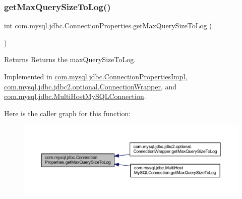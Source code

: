 \subsubsection{\texorpdfstring{get\+Max\+Query\+Size\+To\+Log()}{getMaxQuerySizeToLog()}}
{\footnotesize\ttfamily int com.\+mysql.\+jdbc.\+Connection\+Properties.\+get\+Max\+Query\+Size\+To\+Log (\begin{DoxyParamCaption}{ }\end{DoxyParamCaption})}

\begin{DoxyReturn}{Returns}
Returns the max\+Query\+Size\+To\+Log. 
\end{DoxyReturn}


Implemented in \mbox{\hyperlink{classcom_1_1mysql_1_1jdbc_1_1_connection_properties_impl_af533f73f3b344a7b3b50e647bb90563d}{com.\+mysql.\+jdbc.\+Connection\+Properties\+Impl}}, \mbox{\hyperlink{classcom_1_1mysql_1_1jdbc_1_1jdbc2_1_1optional_1_1_connection_wrapper_a10bd62b5a610b69fcbd7274831405151}{com.\+mysql.\+jdbc.\+jdbc2.\+optional.\+Connection\+Wrapper}}, and \mbox{\hyperlink{classcom_1_1mysql_1_1jdbc_1_1_multi_host_my_s_q_l_connection_a0f63e6682c67051a4e8ed58c16dd50fe}{com.\+mysql.\+jdbc.\+Multi\+Host\+My\+S\+Q\+L\+Connection}}.

Here is the caller graph for this function\+:\nopagebreak
\begin{figure}[H]
\begin{center}
\leavevmode
\includegraphics[width=350pt]{interfacecom_1_1mysql_1_1jdbc_1_1_connection_properties_a55edac0ea8c39a11c087948106b3527c_icgraph}
\end{center}
\end{figure}
\mbox{\label{interfacecom_1_1mysql_1_1jdbc_1_1_connection_properties_a980b503e0c8bf4b37a666526770ad043}} 
